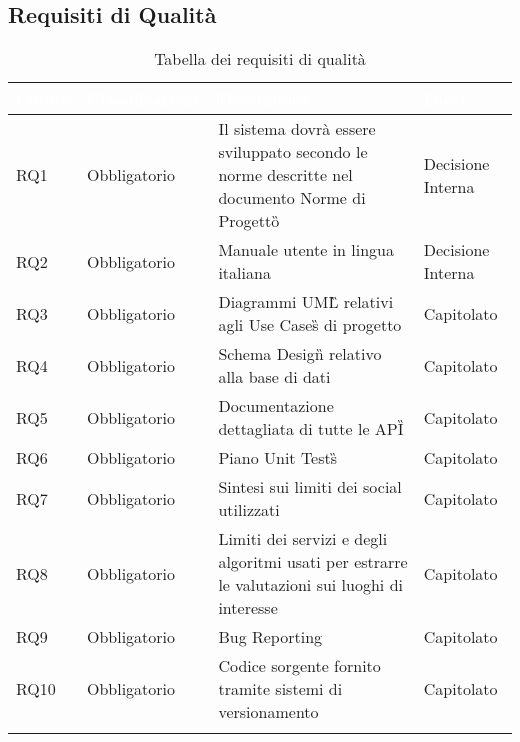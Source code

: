 \subsection{Requisiti di Qualità}
{
      \setlength{\freewidth}{\dimexpr\textwidth-10\tabcolsep}
      \renewcommand{\arraystretch}{1.5}
      \centering
      \setlength{\aboverulesep}{0pt}
      \setlength{\belowrulesep}{0pt}
      \begin{longtable}{C{.15\freewidth} C{.2\freewidth} C{.528\freewidth} C{.15\freewidth}}
         \toprule
      \textcolor{white}{\textbf{Codice}}&
      \textcolor{white}{\textbf{Classificazione}}&
      \textcolor{white}{\textbf{Descrizione}}&
      \textcolor{white}{\textbf{Fonti}}\\	
      \toprule
      \endhead
      
      RQ1 & Obbligatorio & Il sistema dovrà essere sviluppato secondo le norme descritte nel documento Norme di Progetto\G{} & Decisione Interna \\
      RQ2 & Obbligatorio & Manuale utente in lingua italiana & Decisione Interna \\
      RQ3 & Obbligatorio & Diagrammi UML\G{} relativi agli Use Cases\G{} di progetto & Capitolato \\
      RQ4 & Obbligatorio & Schema Design\G{} relativo alla base di dati & Capitolato \\
      RQ5 & Obbligatorio & Documentazione dettagliata di tutte le API\G{} & Capitolato \\
      RQ6 & Obbligatorio & Piano Unit Tests\G{} & Capitolato \\
      RQ7 & Obbligatorio & Sintesi sui limiti dei social utilizzati & Capitolato \\
      RQ8 & Obbligatorio & Limiti dei servizi e degli algoritmi usati per estrarre le valutazioni sui luoghi di interesse & Capitolato \\	   
      RQ9 & Obbligatorio & Bug Reporting & Capitolato \\
      RQ10 & Obbligatorio & Codice sorgente fornito tramite sistemi di versionamento & Capitolato \\
      \bottomrule
      \caption{Tabella dei requisiti di qualità}
      \end{longtable}
}

\newpage
